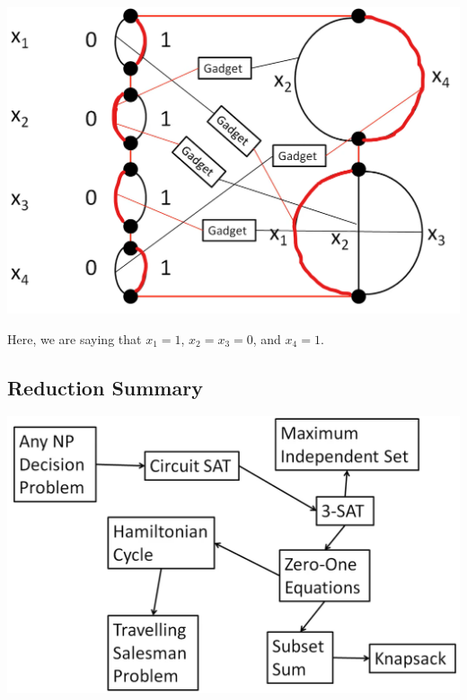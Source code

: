 \documentclass[letterpaper]{article}
\begin{document}
\begin{center}
    \includegraphics[scale=0.3]{assets/zoe_ham_13.png}
\end{center}
Here, we are saying that $x_1 = 1$, $x_2 = x_3 = 0$, and $x_4 = 1$. 

\subsection{Reduction Summary}
\begin{center}
    \includegraphics[scale=0.3]{assets/reduction_summary.png}
\end{center}
\end{document}
